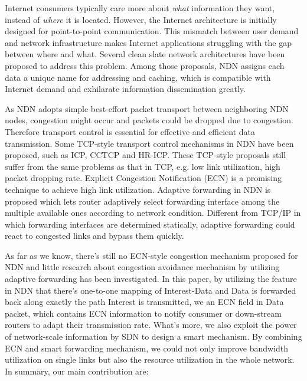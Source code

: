 
Internet consumers typically care more about \emph{what} information they want, instead of \emph{where} it is located. However, the Internet architecture is initially designed for point-to-point communication. This mismatch between user demand and network infrastructure makes Internet applications struggling with the gap between where and what. Several clean slate network architectures have been proposed to address this problem. Among those proposals, NDN\cite{NDN} assigns each data a unique name for addressing and caching, which is compatible with Internet demand and exhilarate information dissemination greatly. 

As NDN adopts simple best-effort packet transport between neighboring NDN nodes, congestion might occur and packets could be dropped due to congestion. Therefore transport control is essential for effective and efficient data transmission. Some TCP-style transport control mechanisms in NDN have been proposed, such as ICP\cite{ICP}, CCTCP\cite{CCTCP} and HR-ICP\cite{shape}. These TCP-style proposals still suffer from the same problems as that in TCP, e.g. low link utilization, high packet dropping rate. Explicit Congestion Notification (ECN) is a promising technique to achieve high link utilization\cite{XCP}. Adaptive forwarding\cite{Adaptive} in NDN is proposed which lets router adaptively select forwarding interface among the multiple available ones according to network condition. Different from TCP/IP in which forwarding interfaces are determined statically, adaptive forwarding could react to congested links and bypass them quickly.

As far as we know, there's still no ECN-style congestion mechanism proposed for NDN and little research about congestion avoidance mechanism by utilizing adaptive forwarding has been investigated. In this paper, by utilizing the feature in NDN that there's one-to-one mapping of Interest-Data and Data is forwarded back along exactly the path Interest is transmitted, we  an ECN field in Data packet, which contains ECN information to notify consumer or down-stream routers to adapt their transmission rate. What's more, we also exploit the power of network-scale information by SDN\cite{SDN} to design a smart  mechanism. By combining ECN and smart forwarding mechanism, we could not only improve bandwidth utilization on single links but also the resource utilization in the whole network. In summary, our main contribution are:


